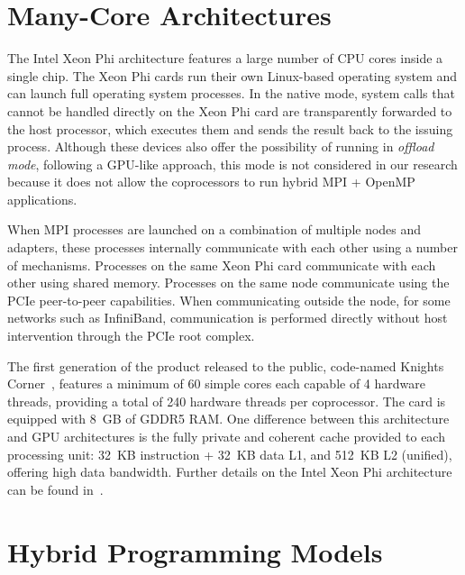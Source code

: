 \section{Many-Core Architectures}\label{sec:back-manycore}

The Intel Xeon Phi architecture features a large number of CPU cores
inside a single chip.  The Xeon Phi cards run their own Linux-based
operating system and can launch full operating system processes.  In
the native mode, system calls that cannot be handled directly on the
Xeon Phi card are transparently forwarded to the host processor, which
executes them and sends the result back to the issuing process.
Although these devices also offer the possibility of running in
\emph{offload mode}, following a GPU-like approach, this mode is not
considered in our research because it does not allow the coprocessors
to run hybrid MPI + OpenMP applications.

When MPI processes are launched on a combination of multiple nodes and
adapters, these processes internally communicate with each other using
a number of mechanisms.  Processes on the same Xeon Phi card
communicate with each other using shared memory.  Processes on the
same node communicate using the PCIe peer-to-peer capabilities.  When
communicating outside the node, for some networks such as InfiniBand,
communication is performed directly without host intervention through
the PCIe root complex.

The first generation of the product released to the public, code-named
Knights Corner~\cite{knc}, features a minimum of 60 simple cores each
capable of 4 hardware threads, providing a total of 240 hardware
threads per coprocessor.  The card is equipped with 8~GB of GDDR5 RAM.
One difference between this architecture and GPU architectures is the
fully private and coherent cache provided to each processing unit:
32~KB instruction + 32~KB data L1, and 512~KB L2 (unified), offering
high data bandwidth.  Further details on the Intel Xeon Phi
architecture can be found in~\cite{mic,knc}.


\section{Hybrid Programming Models}\label{sec:back-hybrid}

